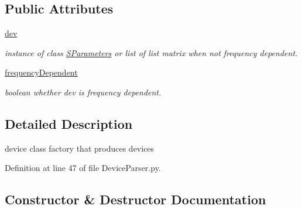 \subsection*{Public Attributes}
\begin{DoxyCompactItemize}
\item 
\mbox{\label{classSignalIntegrity_1_1Parsers_1_1Devices_1_1DeviceParser_1_1DeviceFactory_ac43812121e594f158520698ba706118f}} 
\hyperlink{classSignalIntegrity_1_1Parsers_1_1Devices_1_1DeviceParser_1_1DeviceFactory_ac43812121e594f158520698ba706118f}{dev}
\begin{DoxyCompactList}\small\item\em instance of class \hyperlink{namespaceSignalIntegrity_1_1SParameters}{S\+Parameters} or list of list matrix when not frequency dependent. \end{DoxyCompactList}\item 
\hyperlink{classSignalIntegrity_1_1Parsers_1_1Devices_1_1DeviceParser_1_1DeviceFactory_a3909d31bcdbe6e7a3450d1fa216755a2}{frequency\+Dependent}
\begin{DoxyCompactList}\small\item\em boolean whether dev is frequency dependent. \end{DoxyCompactList}\end{DoxyCompactItemize}


\subsection{Detailed Description}
device class factory that produces devices 

Definition at line 47 of file Device\+Parser.\+py.



\subsection{Constructor \& Destructor Documentation}
\mbox{\label{classSignalIntegrity_1_1Parsers_1_1Devices_1_1DeviceParser_1_1DeviceFactory_ae64f0875afe3067b97ba370b354b9213}} 
